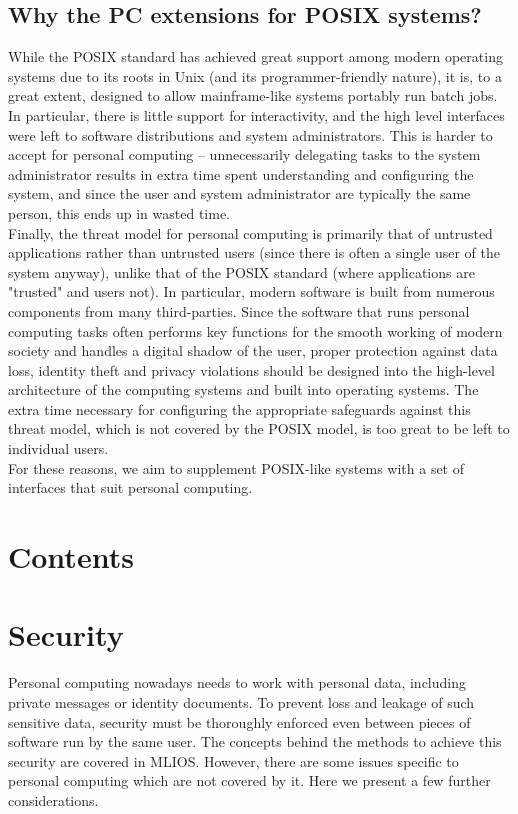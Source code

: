 \documentclass[a4paper,utf8,11pt]{article}
\begin{document}
	\subsection{Why the PC extensions for POSIX systems?}
	While the POSIX standard has achieved great support among modern operating systems due to its roots in Unix (and its programmer-friendly nature), it is, to a great extent, designed to allow mainframe-like systems portably run batch jobs. In particular, there is little support for interactivity, and the high level interfaces were left to software distributions and system administrators. This is harder to accept for personal computing -- unnecessarily delegating tasks to the system administrator results in extra time spent understanding and configuring the system, and since the user and system administrator are typically the same person, this ends up in wasted time.\\
	Finally, the threat model for personal computing is primarily that of untrusted applications rather than untrusted users (since there is often a single user of the system anyway), unlike that of the POSIX standard (where applications are "trusted" and users not). In particular, modern software is built from numerous components from many third-parties. Since the software that runs personal computing tasks often performs key functions for the smooth working of modern society and handles a digital shadow of the user, proper protection against data loss, identity theft and privacy violations should be designed into the high-level architecture of the computing systems and built into operating systems. The extra time necessary for configuring the appropriate safeguards against this threat model, which is not covered by the POSIX model, is too great to be left to individual users.\\
	For these reasons, we aim to supplement POSIX-like systems with a set of interfaces that suit personal computing.
	\clearpage
	\section{Contents}
	\tableofcontents
	\clearpage
	\section{Security}
	Personal computing nowadays needs to work with personal data, including private messages or identity documents. To prevent loss and leakage of such sensitive data, security must be thoroughly enforced even between pieces of software run by the same user. The concepts behind the methods to achieve this security are covered in MLIOS. However, there are some issues specific to personal computing which are not covered by it. Here we present a few further considerations.
\end{document}
